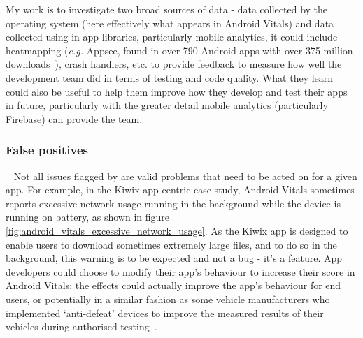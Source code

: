 My work is to investigate two broad sources of data - data collected by the operating system (here effectively what appears in Android Vitals) and data collected using in-app libraries, particularly mobile analytics, it could include heatmapping (\emph{e.g.} Appsee, found in over 790 Android apps with over 375 million downloads~), crash handlers, etc. to provide feedback to measure how well the development team did in terms of testing and code quality. What they learn could also be useful to help them improve how they develop and test their apps in future, particularly with the greater detail mobile analytics (particularly Firebase) can provide the team.

\subsubsection{False positives}~\label{tata-false-positives-topic}
Not all issues flagged by  are valid problems that need to be acted on for a given app. For example, in the Kiwix app-centric case study, Android Vitals sometimes reports excessive network usage running in the background while the device is running on battery, as shown in figure \ref{fig:android_vitals_excessive_network_usage}. As the Kiwix app is designed to enable users to download sometimes extremely large files, and to do so in the background, this warning is to be expected and not a bug - it's a feature. App developers could choose to modify their app's behaviour to increase their score in Android Vitals; the effects could actually improve the app's behaviour for end users, or potentially in a similar fashion as some vehicle manufacturers who implemented `anti-defeat' devices to improve the measured results of their vehicles during authorised testing~.


